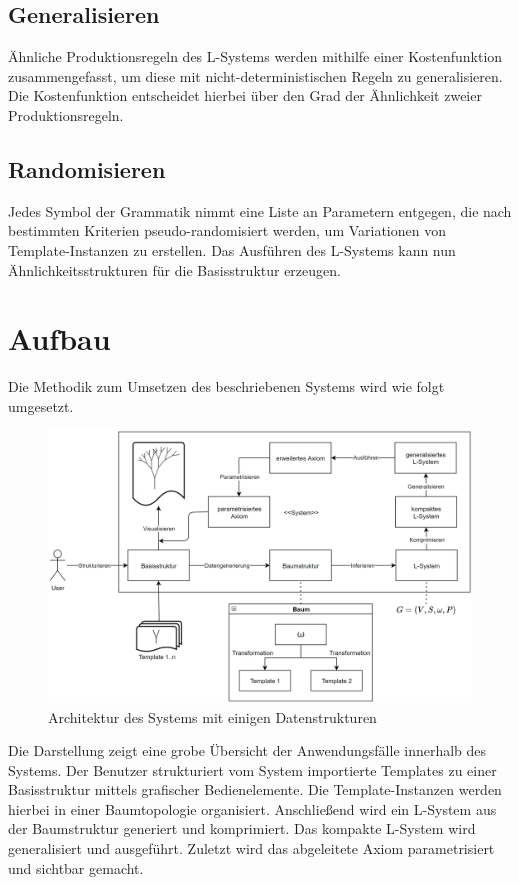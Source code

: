 \subsection*{Generalisieren}
Ähnliche Produktionsregeln des L-Systems werden mithilfe einer Kostenfunktion zusammengefasst, um diese mit
nicht-deterministischen Regeln zu generalisieren.
Die Kostenfunktion entscheidet hierbei über den Grad der Ähnlichkeit zweier Produktionsregeln.

\subsection*{Randomisieren}
Jedes Symbol der Grammatik nimmt eine Liste an Parametern entgegen, die nach bestimmten Kriterien pseudo-randomisiert
werden, um Variationen von Template-Instanzen zu erstellen.
Das Ausführen des L-Systems kann nun Ähnlichkeitsstrukturen für die Basisstruktur erzeugen.

\section{Aufbau}
Die Methodik zum Umsetzen des beschriebenen Systems wird wie folgt umgesetzt.

\begin{figure}[H]
    \centering
    \includegraphics[width=14cm]{../images/System.PNG}
    \caption[Systemarchitektur]{Architektur des Systems mit einigen Datenstrukturen}
\end{figure}

Die Darstellung zeigt eine grobe Übersicht der Anwendungsfälle innerhalb des Systems.
Der Benutzer strukturiert vom System importierte Templates zu einer Basisstruktur mittels grafischer Bedienelemente.
Die Template-Instanzen werden hierbei in einer Baumtopologie organisiert.
Anschließend wird ein L-System aus der Baumstruktur generiert und komprimiert.
Das kompakte L-System wird generalisiert und ausgeführt.
Zuletzt wird das abgeleitete Axiom parametrisiert und sichtbar gemacht.